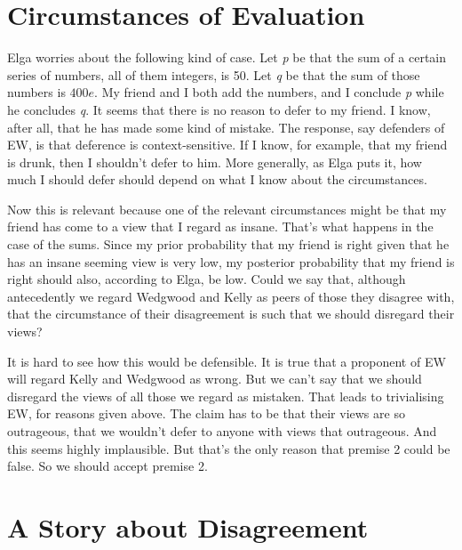 \documentclass[
  10pt,
  letterpaper,
  DIV=11,
  numbers=noendperiod,
  twoside]{scrartcl}
\begin{document}
\section{Circumstances of Evaluation}\label{circumstances-of-evaluation}

Elga worries about the following kind of case. Let \emph{p} be that the
sum of a certain series of numbers, all of them integers, is 50. Let
\emph{q} be that the sum of those numbers is \(400e\). My friend and I
both add the numbers, and I conclude \emph{p} while he concludes
\emph{q}. It seems that there is no reason to defer to my friend. I
know, after all, that he has made some kind of mistake. The response,
say defenders of EW, is that deference is context-sensitive. If I know,
for example, that my friend is drunk, then I shouldn't defer to him.
More generally, as Elga puts it, how much I should defer should depend
on what I know about the circumstances.

Now this is relevant because one of the relevant circumstances might be
that my friend has come to a view that I regard as insane. That's what
happens in the case of the sums. Since my prior probability that my
friend is right given that he has an insane seeming view is very low, my
posterior probability that my friend is right should also, according to
Elga, be low. Could we say that, although antecedently we regard
Wedgwood and Kelly as peers of those they disagree with, that the
circumstance of their disagreement is such that we should disregard
their views?

It is hard to see how this would be defensible. It is true that a
proponent of EW will regard Kelly and Wedgwood as wrong. But we can't
say that we should disregard the views of all those we regard as
mistaken. That leads to trivialising EW, for reasons given above. The
claim has to be that their views are so outrageous, that we wouldn't
defer to anyone with views that outrageous. And this seems highly
implausible. But that's the only reason that premise 2 could be false.
So we should accept premise 2.

\section{A Story about Disagreement}\label{a-story-about-disagreement}
\end{document}

